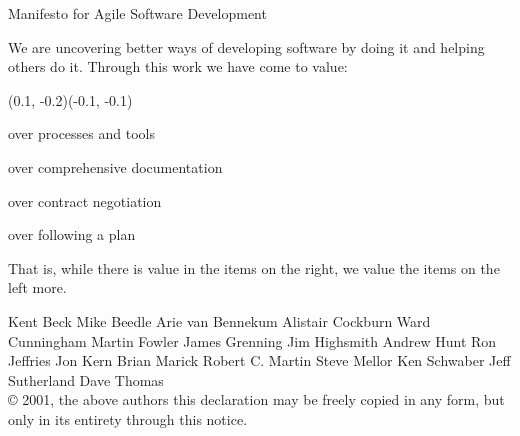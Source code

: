 

\begin{frame}{\large Manifesto for Agile Software Development}

  {\footnotesize \color{black} We are uncovering better ways of developing
  software by doing it and helping others do it.
  Through this work we have come to value:}

  \vfill

  (0.1, -0.2)(-0.1, -0.1)
  \begin{description}
    \begin{small}
      \item [Individuals and interactions] over processes and tools
      \item [Working software] over comprehensive documentation
      \item [Customer collaboration] over contract negotiation
      \item [Responding to change] over following a plan
    \end{small}
  \end{description}

  \vfill

  {\footnotesize That is, while there is value in the items on
  the right, we value the items on the left more.}

  \begin{block}{}
    {\tiny
      Kent Beck\hspace{5pt}
      Mike Beedle\hspace{5pt}
      Arie van Bennekum\hspace{5pt}
      Alistair Cockburn\hspace{5pt}
      Ward Cunningham\hspace{5pt}
      Martin Fowler\hspace{5pt}
      James Grenning\hspace{5pt}
      Jim Highsmith\hspace{5pt}
      Andrew Hunt\hspace{5pt}
      Ron Jeffries\hspace{5pt}
      Jon Kern\hspace{5pt}
      Brian Marick\hspace{5pt}
      Robert C. Martin\hspace{5pt}
      Steve Mellor\hspace{5pt}
      Ken Schwaber\hspace{5pt}
      Jeff Sutherland\hspace{5pt}
      Dave Thomas\\
      © 2001, the above authors
      this declaration may be freely copied in any form, but only in its entirety through this notice.}
  \end{block}

\end{frame}


